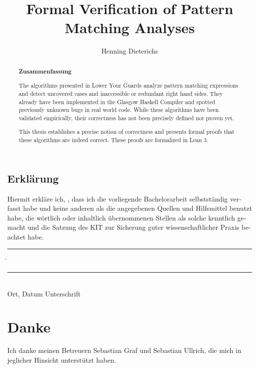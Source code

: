 \documentclass[parskip=no,12pt,a4paper,twoside,headings=openright]{scrreprt}
\title{Formal Verification of Pattern Matching Analyses}
\author{Henning Dieterichs}
\begin{document}
\begin{otherlanguage}{ngerman} %
	\mytitlepage
\end{otherlanguage}

\begin{abstract}
	\begin{center}\Huge\textbf{\textsf{Zusammenfassung}}
	\end{center}
	\vfill


	\vfill

	The algorithms presented in Lower Your Guards \cite{10.1145/3408989} analyze pattern matching expressions and detect uncovered cases and inaccessible or redundant right hand sides.
	They already have been implemented in the Glasgow Haskell Compiler and spotted previously unknown bugs in real world code.
	While these algorithms have been validated empirically, their correctness has not been precisely defined nor proven yet.

	This thesis establishes a precise notion of correctness and
	presents formal proofs that these algorithms are indeed correct.
	These proofs are formalized in Lean 3.
	\vfill

\end{abstract}

\tableofcontents











\begin{otherlanguage}{ngerman}
	\chapter*{Erklärung}
	\pagestyle{empty}

	\vspace{20mm}
	Hiermit erkläre ich, \theauthor, dass ich die vorliegende Bachelorarbeit selbst\-ständig
	verfasst habe und keine anderen als die angegebenen Quellen und Hilfsmittel
	benutzt habe, die wörtlich oder inhaltlich übernommenen Stellen als solche kenntlich gemacht und
	die Satzung des KIT zur Sicherung guter wissenschaftlicher Praxis beachtet habe.
	\vspace{20mm}
	\begin{tabbing}
		\rule{7cm}{.4pt}\hspace{1cm} \= \rule{6.8cm}{.4pt} \\
		Ort, Datum \> Unterschrift
	\end{tabbing}
\end{otherlanguage}

\chapter*{Danke}
\pagestyle{empty}

Ich danke meinen Betreuern Sebastian Graf und Sebastian Ullrich, die mich in jeglicher Hinsicht unterstützt haben.

\pagestyle{fancy}
\end{document}
